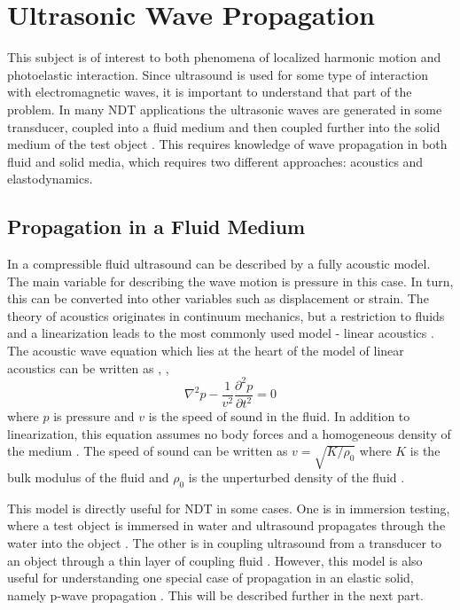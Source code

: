 \documentclass[11pt,twoside]{eitExjobb}
\begin{document}
	\section{Ultrasonic Wave Propagation}
	This subject is of interest to both phenomena of localized harmonic motion and photoelastic interaction. Since ultrasound is used for some type of interaction with electromagnetic waves, it is important to understand that part of the problem. In many NDT applications the ultrasonic waves are generated in some transducer, coupled into a fluid medium and then coupled further into the solid medium of the test object \cite{Schmerr2016}. This requires knowledge of wave propagation in both fluid and solid media, which requires two different approaches: acoustics and elastodynamics.
	
	\subsection{Propagation in a Fluid Medium}
	In a compressible fluid ultrasound can be described by a fully acoustic model. The main variable for describing the wave motion is pressure in this case. In turn, this can be converted into other variables such as displacement or strain. The theory of acoustics originates in continuum mechanics, but a restriction to fluids and a linearization leads to the most commonly used model - linear acoustics \cite{Rossing2014}. The acoustic wave equation which lies at the heart of the model of linear acoustics can be written as \cite{Rossing2014}, \cite{Schmerr2016}, \cite{Kaufman2000}
	\begin{equation}
		\nabla^2 p - \frac{1}{v^2} \frac{\partial^2 p}{\partial t^2} = 0
		\label{eq:th-ac-wave}
	\end{equation}
	where $p$ is pressure and $v$ is the speed of sound in the fluid. In addition to linearization, this equation assumes no body forces and a homogeneous density of the medium \cite{Rossing2014}. The speed of sound can be written as $v = \sqrt{K/\rho_0}$ where $K$ is the bulk modulus of the fluid and $\rho_0$ is the unperturbed density of the fluid \cite{Kaufman2000}.
	
	This model is directly useful for NDT in some cases. One is in immersion testing, where a test object is immersed in water and ultrasound propagates through the water into the object \cite{Schmerr2016}. The other is in coupling ultrasound from a transducer to an object through a thin layer of coupling fluid \cite{Schmerr2016}. However, this model is also useful for understanding one special case of propagation in an elastic solid, namely p-wave propagation \cite{Rossing2014}. This will be described further in the next part.
	
\end{document}

